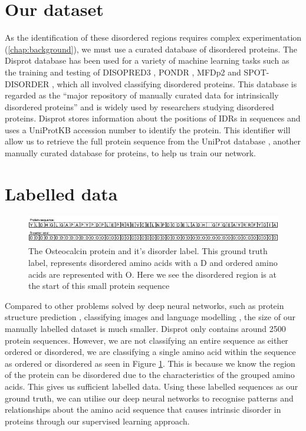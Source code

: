 \documentclass{l4proj}
\begin{document}
\section{Our dataset}

As the identification of these disordered regions requires complex experimentation (\ref{chap:background}), we must use a curated database of disordered proteins. The Disprot database \citep{disprot} has been used for a variety of machine learning tasks such as the training and testing of DISOPRED3 \citep{disopred3_paper}, PONDR \citep{Xue:10}, MFDp2 \citep{Mizianty:13} and SPOT-DISORDER \citep{Hanson:16}, which all involved classifying disordered proteins. This database is regarded as the “major repository of manually curated data for intrinsically disordered proteins” \citep{Quaglia:22} and is widely used by researchers studying disordered proteins. Disprot stores information about the positions of IDRs in sequences and uses a UniProtKB accession number to identify the protein. This identifier will allow us to retrieve the full protein sequence from the UniProt database \citep{uniprot:22}, another manually curated database for proteins, to help us train our network. 

\section{Labelled data}

\begin{figure}
    \centering
    \includegraphics{images/groundtruth.pdf}    

    \caption{The Osteocalcin protein \citep{prot_Q8HYY9} and it's disorder label. This ground truth label, represents disordered amino acids with a D and ordered amino acids are represented with O. Here we see the disordered region is at the start of this small protein sequence}

    \label{fig:groundtruth} 
\end{figure}

Compared to other problems solved by deep neural networks, such as protein structure prediction \citep{Jumper:21}, classifying images \citep{Xie:17} and language modelling \citep{Devlin:18}, the size of our manually labelled dataset is much smaller. Disprot only contains around 2500 protein sequences. However, we are not classifying an entire sequence as either ordered or disordered, we are classifying a single amino acid within the sequence as ordered or disordered as seen in Figure \ref{fig:groundtruth}. This is because we know the region of the protein can be disordered due to the characteristics of the grouped amino acids. This gives us sufficient labelled data. Using these labelled sequences as our ground truth, we can utilise our deep neural networks to recognise patterns and relationships about the amino acid sequence that causes intrinsic disorder in proteins through our supervised learning approach.
\end{document}
